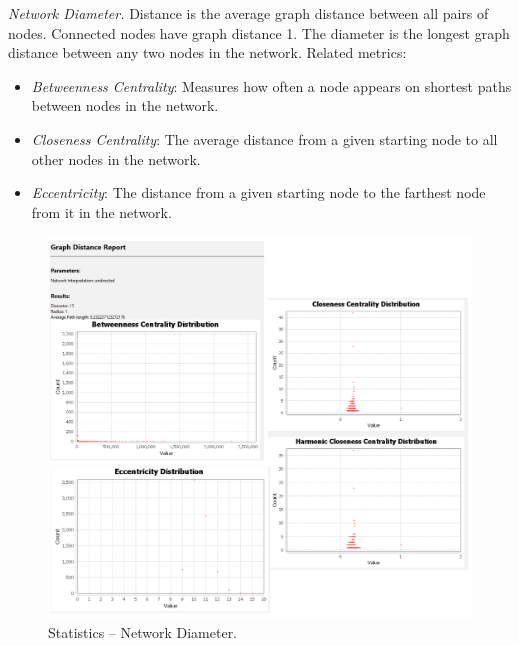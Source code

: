 \documentclass[12pt, a4paper]{article}
\begin{document}
\textit{Network Diameter.} Distance is the average graph distance between all pairs of nodes. Connected nodes have graph distance 1. The diameter is the longest graph distance between any two nodes in the network. Related metrics:
\begin{itemize}
	\item \textit{Betweenness Centrality}: Measures how often a node appears on shortest paths between nodes in the network.
	\item \textit{Closeness Centrality}: The average distance from a given starting node to all other nodes in the network.
	\item \textit{Eccentricity}: The distance from a given starting node to the farthest node from it in the network.
\end{itemize}
\begin{figure}[!h]
\centering
\includegraphics[width=\textwidth]{s6p12.png}
\caption{Statistics -- Network Diameter.}
\end{figure}

\newpage
\end{document}
